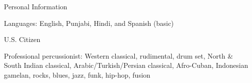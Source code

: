 \documentclass{resume} %
\begin{document}

\begin{rSection}{Personal Information}
\item Languages: English, Punjabi, Hindi, and Spanish (basic)
\item U.S. Citizen
\item Professional percussionist: Western classical, rudimental, drum set, North \& South Indian classical, Arabic/Turkish/Persian classical, Afro-Cuban, Indonesian gamelan, rocks, blues, jazz, funk, hip-hop, fusion
\end{rSection}









\end{document}
